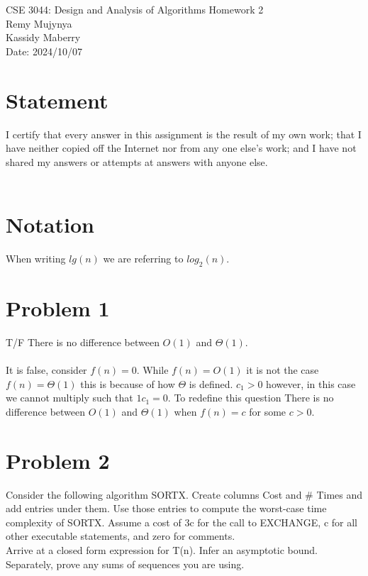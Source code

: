 \documentclass{article}
\begin{document}
\begin{center}
    {\huge
        CSE 3044: Design and Analysis of Algorithms Homework 2\\
    }
    {\large Remy Mujynya\\
          Kassidy Maberry\\}
    Date: 2024/10/07
\end{center}
\section*{Statement}
I certify that every answer in this assignment is the result of my own work; that
I have neither copied off the Internet nor from any one else's work; and I have
not shared my answers or attempts at answers with anyone else.\\\\

\section*{Notation}
When writing $lg(n)$ we are referring to $log_{2}(n)$.\\

\section*{Problem 1}
T/F There is no difference between $O(1)$ and $\Theta(1)$.\\\\

It is false, consider $f(n) = 0$. While $f(n) = O(1)$ it is not 
the case $f(n) = \Theta(1)$ this is because of how $\Theta$ is defined.
$c_{1} > 0$ however, in this case we cannot multiply such that $1c_{1} = 0$.
To redefine this question There is no difference between $O(1)$ and $\Theta(1)$ when 
$f(n) = c$ for some $c > 0$.\\

\section*{Problem 2}
Consider the following algorithm SORTX. Create columns Cost and \# Times and add
entries under them. Use those entries to compute the worst-case time complexity
of SORTX. Assume a cost of 3c for the call to EXCHANGE, c for all other executable
statements, and zero for comments.\\
Arrive at a closed form expression for T(n). Infer an asymptotic bound.\\
Separately, prove any sums of sequences you are using.\\\\
\end{document}
